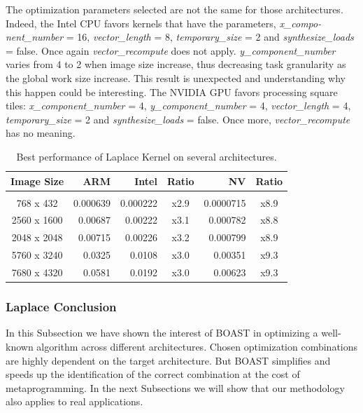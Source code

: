 \documentclass{IEEEtran}
\begin{document}
The optimization parameters selected are not the same for those architectures.
Indeed, the Intel CPU favors kernels that have the parameters,
\emph{x\_compo-nent\_number} = 16, \emph{vector\_length} = 8,
\emph{temporary\_size} = 2 and \emph{synthesize\_loads} = false. Once again
\emph{vector\_recompute} does not apply. \emph{y\_component\_number} varies
from 4 to 2 when image size increase, thus decreasing task granularity as the
global work size increase. This result is unexpected and understanding why this
happen could be interesting. The NVIDIA GPU favors processing square tiles:
\emph{x\_component\_number} = 4, \emph{y\_component\_number} = 4,
\emph{vector\_length} = 4, \emph{temporary\_size} = 2 and
\emph{synthesize\_loads} = false. Once more, \emph{vector\_recompute} has no
meaning.

\begin{table}
\caption{Best performance of Laplace Kernel on several architectures.}
\label{tbl:other}
\centering
\begin{tabular}{c|r|r|c|r|c}
  Image Size & ARM & Intel & Ratio & NV & Ratio \\[4pt]
  \hline&&&&\\[-8pt]
768 x 432   & 0.000639     & 0.000222    & x2.9  & 0.0000715    & x8.9  \\
2560 x 1600 & 0.00687      & 0.00222     & x3.1  & 0.000782     & x8.8  \\
2048 x 2048 & 0.00715      & 0.00226     & x3.2  & 0.000799     & x8.9  \\
5760 x 3240 & 0.0325       & 0.0108      & x3.0  & 0.00351      & x9.3  \\
7680 x 4320 & 0.0581       & 0.0192      & x3.0  & 0.00623      & x9.3  \\
\end{tabular}
\end{table}

    \subsubsection{Laplace Conclusion}

In this Subsection we have shown the interest of BOAST in optimizing a
well-known algorithm across different architectures. Chosen optimization
combinations are highly dependent on the target architecture. But BOAST
simplifies and speeds up the identification of the correct combination at the
cost of metaprogramming. In the next Subsections we will show that our
methodology also applies to real applications.
\end{document}
